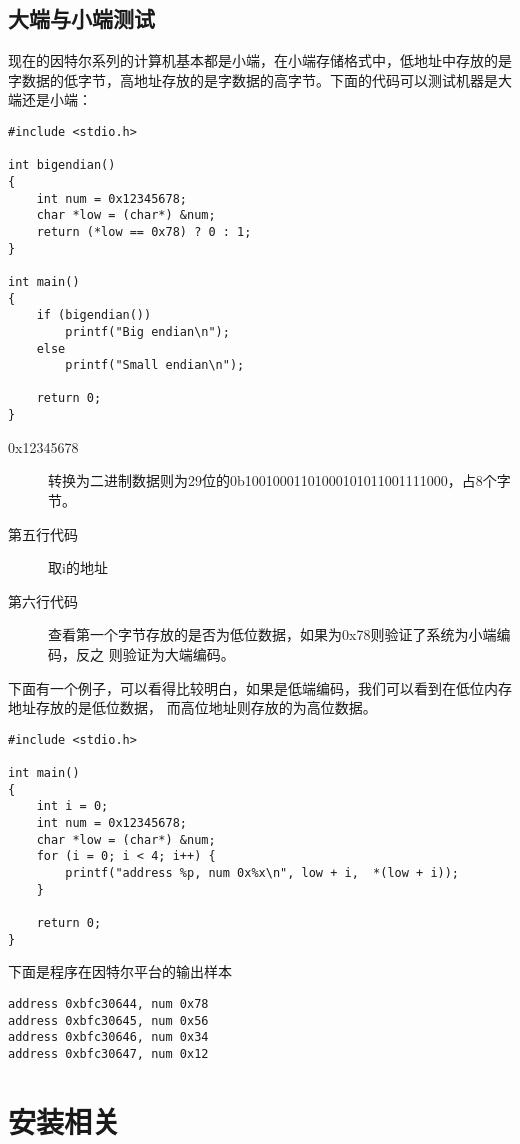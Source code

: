 \documentclass{article}
\begin{document}
\subsection{大端与小端测试}
现在的因特尔系列的计算机基本都是小端，在小端存储格式中，低地址中存放的是
字数据的低字节，高地址存放的是字数据的高字节。下面的代码可以测试机器是大端还是小端：
\begin{verbatim}
#include <stdio.h>

int bigendian() 
{
	int num = 0x12345678;
	char *low = (char*) &num;
	return (*low == 0x78) ? 0 : 1;
}

int main()
{
	if (bigendian()) 
		printf("Big endian\n");
	else 
		printf("Small endian\n");

	return 0;
}
\end{verbatim}
\begin{description}
\item[0x12345678] 转换为二进制数据则为29位的0b10010001101000101011001111000，占8个字节。
\item[第五行代码] 取i的地址
\item[第六行代码] 查看第一个字节存放的是否为低位数据，如果为0x78则验证了系统为小端编码，反之
则验证为大端编码。
\end{description}
下面有一个例子，可以看得比较明白，如果是低端编码，我们可以看到在低位内存地址存放的是低位数据，
而高位地址则存放的为高位数据。

\begin{verbatim}
#include <stdio.h>

int main()
{
	int i = 0;
	int num = 0x12345678;
	char *low = (char*) &num;
	for (i = 0; i < 4; i++) {
		printf("address %p, num 0x%x\n", low + i,  *(low + i));
	}
	
	return 0;
}
\end{verbatim}
下面是程序在因特尔平台的输出样本

\begin{verbatim}
address 0xbfc30644, num 0x78
address 0xbfc30645, num 0x56
address 0xbfc30646, num 0x34
address 0xbfc30647, num 0x12
\end{verbatim}

\section{安装相关}
\end{document}

